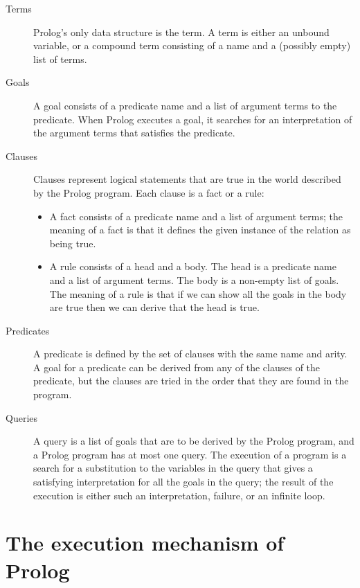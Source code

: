 \documentclass[12pt,a4paper]{report}
\begin{document}
\begin{description}

\item[Terms]
Prolog's only data structure is the term. A term is either an unbound variable, or a compound term consisting of a name and a (possibly empty) list of terms.

\item[Goals]
A goal consists of a predicate name and a list of argument terms to the predicate. When Prolog executes a goal, it searches for an interpretation of the argument terms  that satisfies the predicate.

\item[Clauses] Clauses represent logical statements that are true in the world described by the Prolog program. 
Each clause is a fact or a rule: 
\begin{itemize}
\item 
A fact consists of a predicate name and a list of argument terms; the meaning of a fact is that it defines the given instance of the relation as being true.

\item 
A rule consists of a head and a body. The head is a predicate name and a list of argument terms. The body is a non-empty list of goals. The meaning of a rule is that if we can show all the goals in the body are true then we can derive that the head is true.
\end{itemize}

\item[Predicates]
A predicate is defined by the set of clauses with the same name and arity. A goal for a predicate can be derived from any of the clauses of the predicate, but the clauses are tried in the order that they are found in the program.

\item[Queries]
A query is a list of goals that are to be derived by the Prolog program, and a Prolog program has at most one query. 
The execution of a program is a search for a substitution to the variables in the query that gives a satisfying interpretation for all the goals in the query; the result of the execution is either such an interpretation, failure, or an infinite loop.


\end{description}

\section{The execution mechanism of Prolog}
\end{document}
